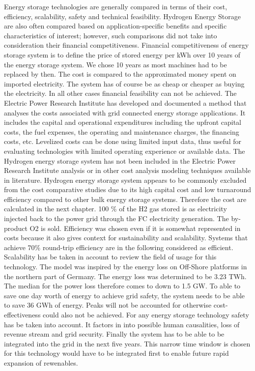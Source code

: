 \begin{parcolumns}[colwidths={1=2.5 cm, 2=10 cm, 3=2.5cm}]{3}
{Energy storage technologies are generally compared in terms of their cost, efficiency, scalability, safety and technical feasibility. Hydrogen Energy Storage are also often compared based on application-specific benefits and specific characteristics of interest; however, such comparisons did not take into consideration their financial competitiveness. Financial competitiveness of energy storage system is to define the price of stored energy per kWh over 10 years of the energy storage system. We chose 10 years as most machines had to be replaced by then. The cost is compared to the approximated money spent on imported electricity. The system has of course be as cheap or cheaper as buying the electricity. In all other cases financial feasibility can not be achieved. The Electric Power Research Institute has developed and documented a method that analyses the costs associated with grid connected energy storage applications. It includes the capital and operational expenditures including the upfront capital costs, the fuel expenses, the operating and maintenance charges, the financing costs, etc. Levelized costs can be done using limited input data, thus useful for evaluating technologies with limited operating experience or available data. The Hydrogen energy storage system has not been included in the Electric Power Research Institute analysis or in other cost analysis modeling techniques available in literature. Hydrogen energy storage system appears to be commonly excluded from the cost comparative studies due to its high capital cost and low turnaround efficiency compared to other bulk energy storage systems.  Therefore the cost are calculated in the next chapter. 100 \% of the H2 gas stored is as electricity injected back to the power grid through the FC electricity generation. The by-product O2 is sold. Efficiency was chosen even if it is somewhat represented in costs because it also gives context for sustainability and scalability. Systems that achieve 70\% round-trip efficiency are in the following considered as efficient. Scalability has be taken in account to review the field of usage for this technology. The model was inspired by the energy loss on Off-Shore platforms in the northern part of Germany. The energy loss was determined to be 3.23 TWh. The median for the power loss therefore comes to down to 1.5 GW. To able to save one day worth of energy to achieve grid safety, the system needs to be able to save 36 GWh of energy. Peaks will not be accounted for otherwise cost-effectiveness could also not be achieved. For any energy storage technology safety has be taken into account. It factors in into possible human causalities, loss of revenue stream and grid security. Finally the system has to be able to be integrated into the grid in the next five years. This narrow time window is chosen for this technology would have to be integrated first to enable future rapid expansion of rewenables.\\

}
\end{parcolumns}
